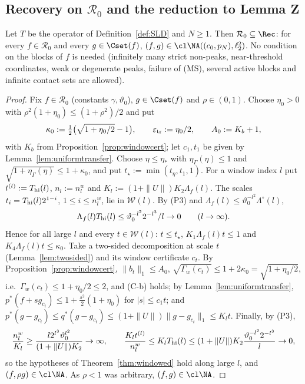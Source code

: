 \subsection{Recovery on $\mathcal R_0$ and the reduction to Lemma Z}

\begin{theorem}\label{thm:R0}
Let $T$ be the operator of Definition~\ref{def:SLD} and $N\ge1$.  Then
$\mathcal R_0\subseteq\Rec$: for every $f\in\mathcal R_0$ and every
$g\in\Cset(f)$, $(f,g)\in\cl\NA((c_0,p_N),\ell_2^2)$.  No condition on the
blocks of $f$ is needed \textup{(}infinitely many strict non-peaks,
near-threshold coordinates, weak or degenerate peaks, failure of
\textup{(MS)}, several active blocks and infinite contact sets are
allowed\textup{)}.
\end{theorem}

\begin{proof}
Fix $f\in\mathcal R_0$ (constants $\gamma,\vartheta_0$), $g\in\Cset(f)$ and
$\rho\in(0,1)$.  Choose $\eta_0>0$ with $\rho^2(1+\eta_0)\le(1+\rho^2)/2$ and
put
\[
 \kappa_0:=\tfrac12\big(\sqrt{1+\eta_0/2}-1\big),\qquad
 \varepsilon_{\rm tr}:=\eta_0/2,\qquad A_0:=K_b+1,
\]
with $K_b$ from Proposition~\ref{prop:windowcert}; let $c_1,t_1$ be given by
Lemma~\ref{lem:uniformtransfer}.  Choose $\eta\le\eta_*$ with
$\eta_\Gamma(\eta)\le1$ and $\sqrt{1+\eta_\Gamma(\eta)}\le1+\kappa_0$, and put
$t_\star:=\min(t_\eta,t_1,1)$.  For a window index $l$ put $t^{(l)}:=
T_{\rm hi}(l)$, $n_l:=n^w_l$ and $K_l:=(1+\|U\|)K_2\Lambda_f(l)$.  The scales
$t_i=T_{\rm hi}(l)2^{1-i}$, $1\le i\le n^w_l$, lie in $\mathcal W(l)$.  By
(P3) and $\Lambda_f(l)\le\vartheta_0^{-l^2}\Lambda^\circ(l)$,
\[
 \Lambda_f(l)T_{\rm hi}(l)\le\vartheta_0^{-l^2}2^{-l^3}/l\to0\qquad(l\to\infty).
\]
Hence for all large $l$ and every $t\in\mathcal W(l)$: $t\le t_\star$,
$K_1\Lambda_f(l)t\le1$ and $K_4\Lambda_f(l)t\le\kappa_0$.  Take a two-sided
decomposition at scale $t$ (Lemma~\ref{lem:twosided}) and its window
certificate $c_t$.  By Proposition~\ref{prop:windowcert},
$\|b_t\|_1\le A_0$, $\sqrt{\Gamma_w(c_t)}\le1+2\kappa_0=\sqrt{1+\eta_0/2}$,
i.e.\ $\Gamma_w(c_t)\le1+\eta_0/2\le2$, and (C-b) holds; by
Lemma~\ref{lem:uniformtransfer}, $p^*(f+sg_{c_t})\le1+\frac{s^2}2(1+\eta_0)$
for $|s|\le c_1t$; and $p^*(g-g_{c_t})\le q^*(g-g_{c_t})\le(1+\|U\|)
\|g-g_{c_t}\|_1\le K_lt$.  Finally, by (P3),
\[
 \frac{n^w_l}{K_l}\ge\frac{l2^{l^3}\vartheta_0^{l^2}}{(1+\|U\|)K_2}\to\infty,
 \qquad\frac{K_lt^{(l)}}{n^w_l}\le K_lT_{\rm hi}(l)\le(1+\|U\|)K_2
 \frac{\vartheta_0^{-l^2}2^{-l^3}}l\to0,
\]
so the hypotheses of Theorem~\ref{thm:windowed} hold along large $l$, and
$(f,\rho g)\in\cl\NA$.  As $\rho<1$ was arbitrary, $(f,g)\in\cl\NA$.
\end{proof}

